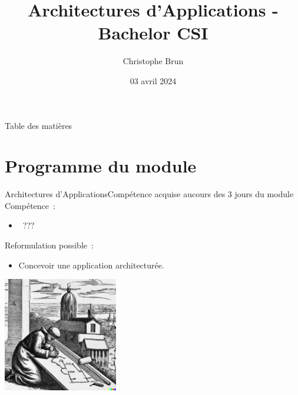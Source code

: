 \documentclass{beamer}
\title{Architectures d’Applications - Bachelor CSI}
\author{Christophe Brun}
\institute{Campus Saint-Michel IT}
\date{03 avril 2024}
\begin{document}
    \begin{frame}
        \titlepage
    \end{frame}

    \begin{frame}{Table des matières}
        \begin{tiny}
            \tableofcontents
        \end{tiny}
    \end{frame}


    \section{Programme du module}\label{sec:programme-du-module}
    \begin{frame}{Architectures d’Applications}{Compétence acquise aucours des 3 jours du module}
        Compétence~:
        \begin{itemize}
            \item {}~???
        \end{itemize}
        \pause
        \bigbreak
        Reformulation possible~:
        \begin{itemize}
            \item Concevoir une application architecturée.
        \end{itemize}
        \centering
        \includegraphics[width=5cm]{image/engraving-of-a-monk-drawing-a-cathedral}
    \end{frame}
\end{document}
